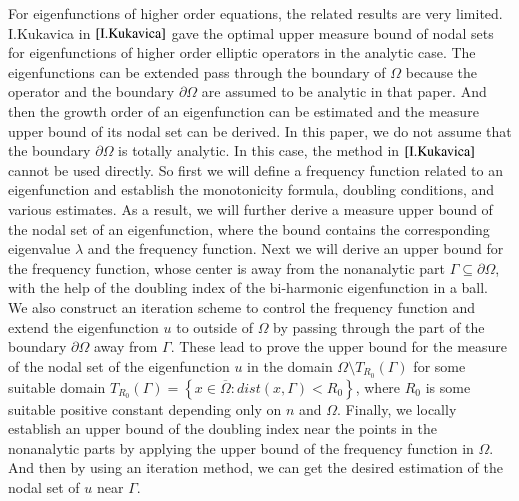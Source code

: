 \documentclass[a4paper, 12pt, onecolumn]{article} \textwidth 148mm
\begin{document}
For eigenfunctions of higher order equations, the related results are very limited.  I.Kukavica in $\cite{I.Kukavica}$ gave the optimal upper measure bound of nodal sets for eigenfunctions of higher order elliptic operators in the analytic case. The eigenfunctions can be extended pass through the boundary of $\Omega$ because the operator and the boundary $\partial\Omega$ are assumed to be analytic in that paper. And then the growth order of an eigenfunction can be estimated and the measure upper bound of its nodal set can be derived. In this paper, we do not assume that the boundary $\partial\Omega$ is totally analytic. In this case, the method in $\cite{I.Kukavica}$ cannot be used directly.
So first we will define a frequency function related to an eigenfunction and establish the monotonicity formula, doubling conditions, and various estimates. As a result, we will further derive a measure upper bound of the nodal set of an eigenfunction, where the bound contains the  corresponding eigenvalue $\lambda$ and the frequency function. Next we will derive an upper bound for the frequency function, whose center is away from the nonanalytic part $\Gamma\subseteq\partial\Omega$, with the help of the doubling index of the bi-harmonic eigenfunction in a ball. We also construct an iteration scheme to control the frequency function and
extend the eigenfunction $u$ to outside of $\Omega$ by passing through the part of the boundary $\partial\Omega$ away from $\Gamma$. These lead to prove the upper bound for the measure of the nodal set of the eigenfunction $u$ in the domain $\Omega\setminus T_{R_0}(\Gamma)$ for some suitable domain
$T_{R_0}(\Gamma)=\left\{x\in\overline{\Omega}:dist(x,\Gamma)<R_0\right\}$, where $R_0$ is some suitable positive constant depending only on $n$ and $\Omega$. Finally, we locally establish an upper bound of the doubling index near the points in the nonanalytic parts by applying the upper bound of the frequency function in $\Omega$. And then by using an iteration method, we can get the desired estimation of the nodal set of $u$ near $\Gamma$.
\end{document}
